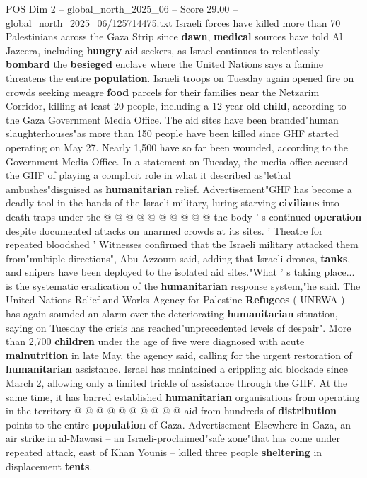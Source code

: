 \begin{textsample}{POS Dim 2 – global\_north\_2025\_06 – Score 29.00 – global\_north\_2025\_06/125714475.txt}  \label{ex:f2_pos_223}
Israeli forces have killed more than 70 Palestinians across the Gaza Strip since \textbf{dawn}, \textbf{medical} sources have told Al Jazeera, including \textbf{hungry} aid seekers, as Israel continues to relentlessly \textbf{bombard} the \textbf{besieged} enclave where the United Nations says a famine threatens the entire \textbf{population}.
Israeli troops on Tuesday again opened fire on crowds seeking meagre \textbf{food} parcels for their families near the Netzarim Corridor, killing at least 20 people, including a 12-year-old \textbf{child}, according to the Gaza Government Media Office.
The aid sites have been branded"human slaughterhouses"as more than 150 people have been killed since GHF started operating on May 27.
Nearly 1,500 have so far been wounded, according to the Government Media Office.
In a statement on Tuesday, the media office accused the GHF of playing a complicit role in what it described as"lethal ambushes"disguised as \textbf{humanitarian} relief.
Advertisement"GHF has become a deadly tool in the hands of the Israeli military, luring starving \textbf{civilians} into death traps under the @ @ @ @ @ @ @ @ @ @ the body ' s continued \textbf{operation} despite documented attacks on unarmed crowds at its sites. ' Theatre for repeated bloodshed ' Witnesses confirmed that the Israeli military attacked them from"multiple directions", Abu Azzoum said, adding that Israeli drones, \textbf{tanks}, and snipers have been deployed to the isolated aid sites."What ' s taking place... is the systematic eradication of the \textbf{humanitarian} response system,"he said.
The United Nations Relief and Works Agency for Palestine \textbf{Refugees} ( UNRWA ) has again sounded an alarm over the deteriorating \textbf{humanitarian} situation, saying on Tuesday the crisis has reached"unprecedented levels of despair".
More than 2,700 \textbf{children} under the age of five were diagnosed with acute \textbf{malnutrition} in late May, the agency said, calling for the urgent restoration of \textbf{humanitarian} assistance.
Israel has maintained a crippling aid blockade since March 2, allowing only a limited trickle of assistance through the GHF.
At the same time, it has barred established \textbf{humanitarian} organisations from operating in the territory @ @ @ @ @ @ @ @ @ @ aid from hundreds of \textbf{distribution} points to the entire \textbf{population} of Gaza.
Advertisement Elsewhere in Gaza, an air strike in al-Mawasi -- an Israeli-proclaimed"safe zone"that has come under repeated attack, east of Khan Younis -- killed three people \textbf{sheltering} in displacement \textbf{tents}.

\end{textsample}
